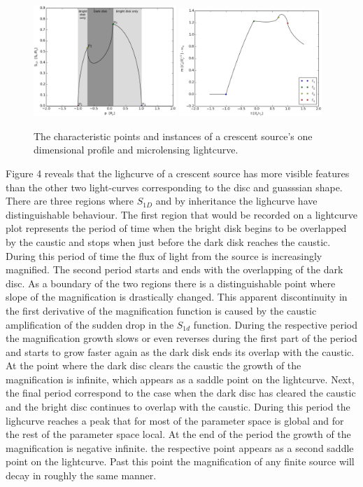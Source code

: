 \begin{figure}
\centering
	\includegraphics[width = 0.48\textwidth]{plots/ch_points.eps}
        \includegraphics[width = 0.48\textwidth]{plots/ch_instances.eps}
\caption{\label{fig:char_points} The characteristic points and instances of a crescent source's one dimensional profile and microlensing lightcurve. }
\end{figure}


Figure 4 reveals that the lighcurve of a crescent source has more visible features than the other two light-curves
corresponding to the disc and guasssian shape. There are three regions where $S_{1D}$ and by inheritance the lighcurve
 have distinguishable behaviour. The first region that would be recorded on a lightcurve plot represents the period
of time when the bright disk begins to be overlapped by the caustic and stops when just before the dark disk reaches
the caustic. During this period of time the flux of light from the source is increasingly magnified. The second
period starts and ends with the overlapping of the dark disc. As a boundary of the two regions there is a
distinguishable point where slope of the magnification is drastically changed. This apparent discontinuity in the
first derivative of the magnification function is caused by the caustic amplification of the sudden drop in the $S_{1d}$
function. During the respective period the magnification growth slows or even reverses during the first part of the
period and starts to grow faster again as the dark disk ends its overlap with the caustic. At the point where
the dark disc clears the caustic the growth of the magnification is infinite, which appears as a saddle point
on the lightcurve. Next, the final period correspond to the case when the dark disc has cleared the caustic
and the bright disc continues to overlap with the caustic. During this period the lighcurve reaches a peak
that for most of the parameter space is global and for the rest of the parameter space local.
At the end of the period the growth of the magnification is negative infinite. the respective point appears 
as a second saddle point on the lightcurve. Past this point the magnification of any finite source will 
decay in roughly the same manner. \\

